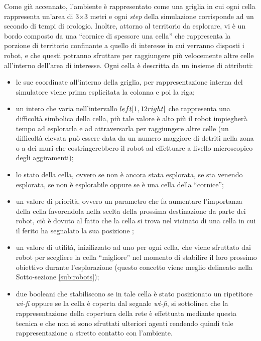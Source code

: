 Come già accennato, l'ambiente è rappresentato come una griglia in cui ogni cella rappresenta un'area di 3$\times$3 metri e ogni \textit{step} della simulazione corrisponde ad un secondo di tempi di orologio.
Inoltre, attorno al territorio da esplorare, vi è un bordo composto da una “cornice di spessore una cella” che rappresenta la porzione di territorio confinante a quello di interesse in cui verranno disposti i robot, e che questi potranno sfruttare per raggiungere più velocemente altre celle all'interno dell'area di interesse.
Ogni cella è descritta da un insieme di attributi:
\begin{itemize}
	\item le sue coordinate all'interno della griglia, per rappresentazione interna del simulatore viene prima esplicitata la colonna e poi la riga;
	\item un intero che varia nell'intervallo $\\left[1, 12\\right]$ che rappresenta una difficoltà simbolica della cella, più tale valore è alto più il robot impiegherà tempo ad esplorarla e ad attraversarla per raggiungere altre celle (un difficoltà elevata può essere data da un numero maggiore di detriti nella zona o a dei muri che costringerebbero il robot ad effettuare a livello microscopico degli aggiramenti);
	\item lo stato della cella, ovvero se non è ancora stata esplorata, se sta venendo esplorata, se non è esplorabile oppure se è una cella della “cornice”;
	\item un valore di priorità, ovvero un parametro che fa aumentare l'importanza della cella favorendola nella scelta della prossima destinazione da parte dei robot, ciò è dovuto al fatto che la cella si trova nel vicinato di una cella in cui il ferito ha segnalato la sua posizione ;
	\item un valore di utilità, inizilizzato ad uno per ogni cella, che viene sfruttato dai robot per scegliere la cella “migliore” nel momento di stabilire il loro prossimo obiettivo durante l'esplorazione (questo concetto viene meglio delineato nella Sotto-sezione \ref{sub:robots});
	\item due booleani che stabiliscono se in tale cella è stato posizionato un ripetitore \textit{wi-fi} oppure se la cella è coperta dal segnale \textit{wi-fi}, si sottolinea che la rappresentazione della copertura della rete è effettuata mediante questa tecnica e che non si sono sfruttati ulteriori agenti rendendo quindi tale rappresentazione a stretto contatto con l'ambiente.
\end{itemize}

